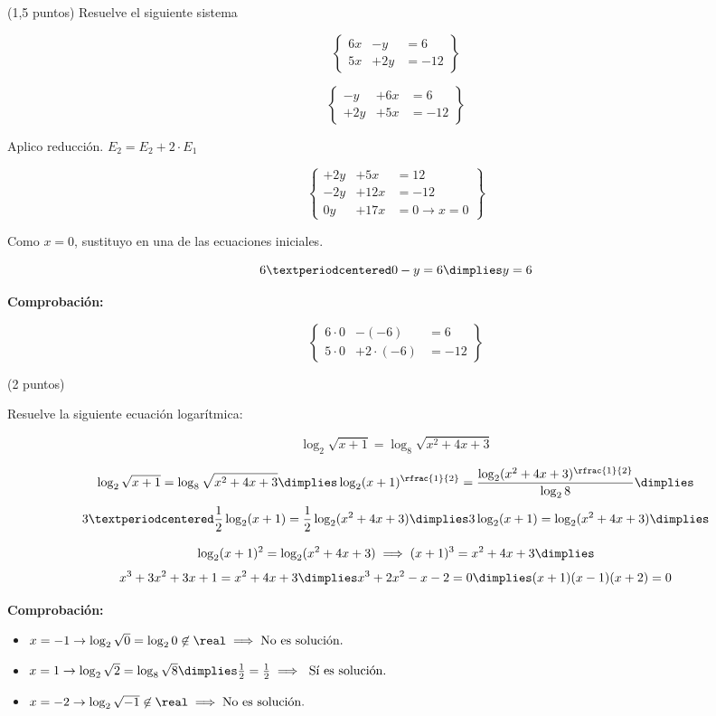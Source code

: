 \documentclass[palatino,nosec]{Docencia}
\begin{document}
\begin{problem}(1,5 puntos) 
Resuelve el siguiente sistema 

\[
\left\{
	\begin{array}{ccc}
		6x&-y&=6\\
		5x&+2y&=-12
	\end{array}
\right\}
\]

\solution

\[
\left\{
	\begin{array}{ccc}
		-y&+6x&=6\\
		+2y&+5x&=-12
	\end{array}
\right\}
\]

Aplico reducción. $E_2 = E_2+2·E_1$

\[
\left\{
	\begin{array}{lll}
		+2y&+5x&=12\\
		-2y&+12x&=-12\\\hline
		0y&+17x &= 0 \to x=0
	\end{array}
\right\}
\]

Como $x=0$, sustituyo en una de las ecuaciones iniciales.

\[
	6·0-y=6 \dimplies y=6
\]

\textbf{Comprobación:}

\[
\left\{
	\begin{array}{ccc}
		6·0&-(-6)&=6\\
		5·0&+2·(-6)&=-12
	\end{array}
\right\}
\]

\end{problem}

\begin{problem} (2 puntos)

Resuelve la siguiente ecuación logarítmica:

\[\log_2\sqrt{x+1} = \log_8\sqrt{x^2+4x+3}\]

\solution

\[
	\log_2\sqrt{x+1} = \log_8\sqrt{x^2+4x+3} \dimplies \log_2(x+1)^{\rfrac{1}{2}} = \frac{\log_2(x^2+4x+3)^{\rfrac{1}{2}}}{\log_28} \dimplies \]
\[
	3·\frac{1}{2}\log_2(x+1) = \frac{1}{2}\log_2(x^2+4x+3)\dimplies 3\log_2(x+1) = \log_2(x^2+4x+3) \dimplies\]

\[ 
	\log_2(x+1)^2 = \log_2(x^2+4x+3) \implies (x+1)^3 = x^2+4x+3 \dimplies
\]
\[
	x^3+3x^2+3x+1 = x^2+4x+3 \dimplies x^3+2x^2-x-2= 0 \dimplies (x+1)(x-1)(x+2) = 0
\]

\textbf{Comprobación:}

\begin{itemize}
	\item $x=-1\to \log_2\sqrt{0} = \log_20\not\in\real\implies\text{No es solución}.$
	\item $x=1 \to \log_2\sqrt{2} = \log_8\sqrt{8} \dimplies \frac{1}{2} = \frac{1}{2}\implies \text{ Sí es solución.}$
	\item $x=-2 \to \log_2\sqrt{-1}\not\in\real\implies\text{No es solución}.$
\end{itemize}


\end{problem}
\end{document}
